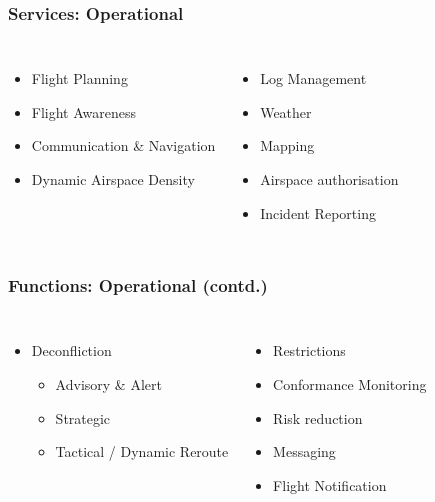 \documentclass[usenames,dvipsnames,aspectratio=169,serif]{beamer}
\begin{document}

\begin{frame}
   \frametitle{Services: Operational}
   \begin{columns}[t] %

      \begin{itemize}
         \item Flight Planning
         \item Flight Awareness
         \item Communication \& Navigation
         \item Dynamic Airspace Density
      \end{itemize}

      \begin{itemize}
         \item Log Management
         \item Weather
         \item Mapping
         \item Airspace authorisation
         \item Incident Reporting
      \end{itemize}
   \end{columns}
\end{frame}

\begin{frame}
   \frametitle{Functions: Operational (contd.)}
   \begin{columns}[t] %

      \begin{itemize}
         \item Deconfliction
            \begin{itemize}
               \item Advisory \& Alert
               \item Strategic
               \item Tactical / Dynamic Reroute
            \end{itemize}
      \end{itemize}

      \begin{itemize}
         \item Restrictions
         \item Conformance Monitoring
         \item Risk reduction
         \item Messaging
         \item Flight Notification
      \end{itemize}
   \end{columns}

\end{frame}
\end{document}
